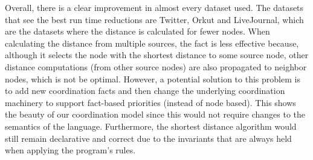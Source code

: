 Overall, there is a clear improvement in almost every dataset used. The datasets
that see the best run time reductions are Twitter, Orkut and LiveJournal, which
are the datasets where the distance is calculated for fewer nodes. When
calculating the distance from multiple sources, the  fact is
less effective because, although it selects the node with the shortest distance
to some source node, other distance computations (from other source nodes) are
also propagated to neighbor nodes, which is not be optimal. However,
a potential solution to this problem is to add new coordination facts
and then change the underlying coordination machinery to support fact-based priorities (instead of node based).
This shows the beauty of our coordination model since this would not require changes to the semantics of the language.
Furthermore, the shortest distance algorithm would still remain declarative and correct
due to the invariants that are always held when applying the program's rules.

